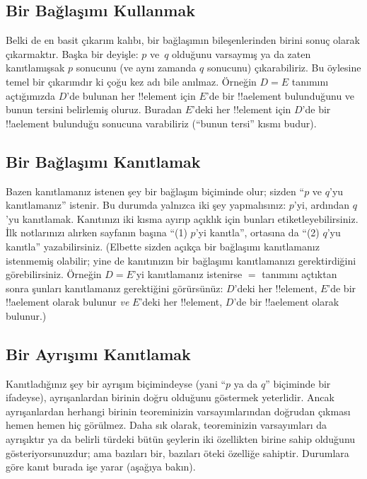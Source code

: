 \documentclass[../../../include/open-logic-section]{subfiles}
\begin{document}
\subsection{Bir Bağlaşımı Kullanmak}

Belki de en basit çıkarım kalıbı, bir bağlaşımın bileşenlerinden birini
sonuç olarak çıkarmaktır. Başka bir deyişle: $p$ ve~$q$ olduğunu
varsaymış ya da zaten kanıtlamışsak $p$ sonucunu (ve aynı zamanda $q$
sonucunu) çıkarabiliriz. Bu öylesine temel bir çıkarımdır ki çoğu kez
adı bile anılmaz. Örneğin $D = E$ tanımını açtığımızda $D$'de bulunan
her !!{element} için $E$'de bir !!a{element} bulunduğunu ve bunun
tersini belirlemiş oluruz. Buradan $E$'deki her !!{element} için $D$'de
bir !!a{element} bulunduğu sonucuna varabiliriz (``bunun tersi'' kısmı budur).

\subsection{Bir Bağlaşımı Kanıtlamak}

Bazen kanıtlamanız istenen şey bir bağlaşım biçiminde olur; sizden
``$p$ ve $q$'yu kanıtlamanız'' istenir. Bu durumda yalnızca iki şey
yapmalısınız: $p$'yi, ardından $q$'yu kanıtlamak. Kanıtınızı iki kısma
ayırıp açıklık için bunları etiketleyebilirsiniz. İlk notlarınızı
alırken sayfanın başına ``(1) $p$'yi kanıtla'', ortasına da ``(2)
$q$'yu kanıtla'' yazabilirsiniz. (Elbette sizden açıkça bir bağlaşımı
kanıtlamanız istenmemiş olabilir; yine de kanıtınızın bir bağlaşımı
kanıtlamanızı gerektirdiğini görebilirsiniz. Örneğin $D = E$'yi
kanıtlamanız istenirse $=$ tanımını açtıktan sonra şunları kanıtlamanız
gerektiğini görürsünüz: $D$'deki her !!{element}, $E$'de bir
!!a{element} olarak bulunur \emph{ve} $E$'deki her !!{element}, $D$'de
bir !!a{element} olarak bulunur.)

\subsection{Bir Ayrışımı Kanıtlamak}

Kanıtladığınız şey bir ayrışım biçimindeyse (yani ``$p$ ya da $q$''
biçiminde bir ifadeyse), ayrışanlardan birinin doğru olduğunu göstermek
yeterlidir. Ancak ayrışanlardan herhangi birinin teoreminizin
varsayımlarından doğrudan çıkması hemen hemen hiç görülmez. Daha sık
olarak, teoreminizin varsayımları da ayrışıktır ya da belirli türdeki
bütün şeylerin iki özellikten birine sahip olduğunu gösteriyorsunuzdur;
ama bazıları bir, bazıları öteki özelliğe sahiptir. Durumlara göre kanıt
burada işe yarar (aşağıya bakın).
\end{document}
